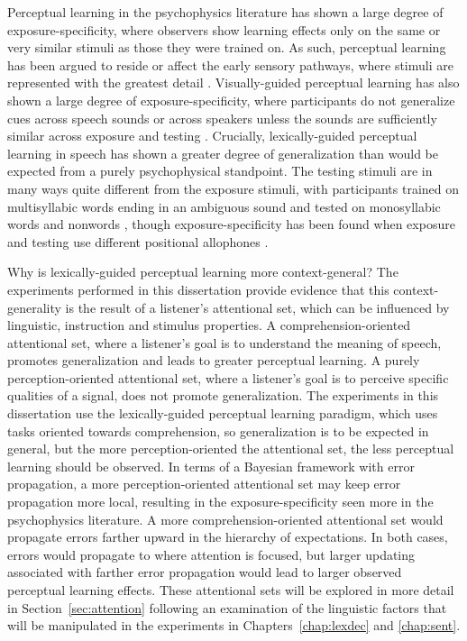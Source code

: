 Perceptual learning in the psychophysics literature has shown a large degree of exposure-specificity, where observers show learning effects only on the same or very similar stimuli as those they were trained on. 
As such, perceptual learning has been argued to reside or affect the early sensory pathways, where stimuli are represented with the greatest detail \citep{Gilbert2001}.  
Visually-guided perceptual learning has also shown a large degree of exposure-specificity, where participants do not generalize cues across speech sounds \citep{Reinisch2014} or across speakers unless the sounds are sufficiently similar across exposure and testing \citep{Eisner2005, Kraljic2005, Kraljic2007, Reinisch2013a}.  
Crucially, lexically-guided perceptual learning in speech has shown a greater degree of generalization than would be expected from a purely psychophysical standpoint.  
The testing stimuli are in many ways quite different from the exposure stimuli, with participants trained on multisyllabic words ending in an ambiguous sound and tested on monosyllabic words \citep{Reinisch2013} and nonwords \citep{Norris2003, Kraljic2005}, though exposure-specificity has been found when exposure and testing use different positional allophones \citep{Mitterer2013}.

Why is lexically-guided perceptual learning more context-general?
The experiments performed in this dissertation provide evidence that this context-generality is the result of a listener's attentional set, which can be influenced by linguistic, instruction and stimulus properties.
A comprehension-oriented attentional set, where a listener's goal is to understand the meaning of speech, promotes generalization and leads to greater perceptual learning.  
A purely perception-oriented attentional set, where a listener's goal is to perceive specific qualities of a signal, does not promote generalization.
The experiments in this dissertation use the lexically-guided perceptual learning paradigm, which uses tasks oriented towards comprehension, so generalization is to be expected in general, but the more perception-oriented the attentional set, the less perceptual learning should be observed.
In terms of a Bayesian framework with error propagation, a more perception-oriented attentional set may keep error propagation more local, resulting in the exposure-specificity seen more in the psychophysics literature.
A more comprehension-oriented attentional set would propagate errors farther upward in the hierarchy of expectations.
In both cases, errors would propagate to where attention is focused, but larger updating associated with farther error propagation would lead to larger observed perceptual learning effects.
These attentional sets will be explored in more detail in Section~\ref{sec:attention} following an examination of the linguistic factors that will be manipulated in the experiments in Chapters~\ref{chap:lexdec} and \ref{chap:sent}.

